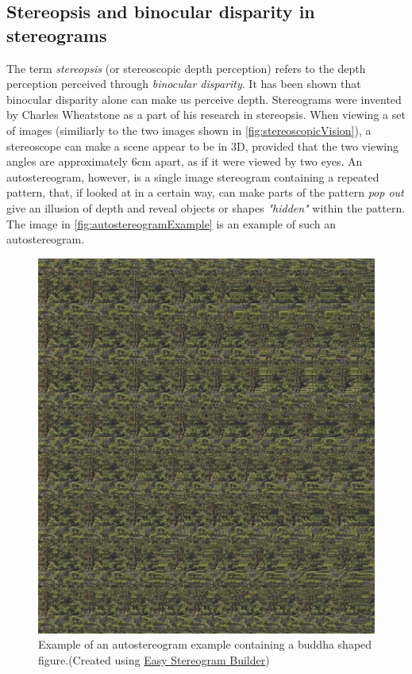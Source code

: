 \subsection{Stereopsis and binocular disparity in stereograms}\label{sec:stereograms}
The term \textit{stereopsis} (or stereoscopic depth perception) refers to the depth perception perceived through \textit{binocular disparity}\citep{sensationPerception,seeingInThreeDimensions}. It has been shown that binocular disparity alone can make us perceive depth\citep{autostereograms}. Stereograms were invented by Charles Wheatstone as a part of his research in stereopsis. 
When viewing a set of images (similiarly to the two images shown in \autoref{fig:stereoscopicVision}), a stereoscope can make a scene appear to be in 3D, provided that the two viewing angles are approximately 6cm apart, as if it were viewed by two eyes\citep[p.~212]{sensationPerception}. 
An autostereogram, however, is a single image stereogram containing a repeated pattern, that, if looked at in a certain way, can make parts of the pattern \textit{pop out} give an illusion of depth and reveal objects or shapes \textit{"hidden"} within the pattern\citep{autostereograms}. The image in \autoref{fig:autostereogramExample} is an example of such an autostereogram.

\begin{figure}[H]
	\centering
	\includegraphics[width=1\linewidth]{figure/Analysis/autostereogram.jpg}
	\caption{Example of an autostereogram example containing a buddha shaped figure.(Created using \href{http://www.easystereogrambuilder.com/3d-stereogram-maker.aspx}{\color{blue}Easy Stereogram Builder})}
	\label{fig:autostereogramExample}
\end{figure}

